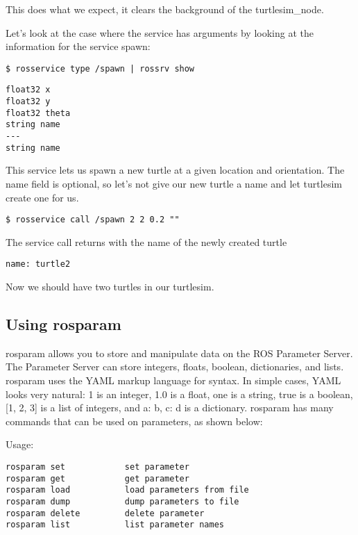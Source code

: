 This does what we expect, it clears the background of the turtlesim\_node.

Let's look at the case where the service has arguments by looking at the information for the service spawn:

\begin{lstlisting}[breaklines=true languages=bash]
$ rosservice type /spawn | rossrv show
\end{lstlisting}

\begin{lstlisting}[breaklines=true languages=bash]
float32 x
float32 y
float32 theta
string name
---
string name
\end{lstlisting}

This service lets us spawn a new turtle at a given location and orientation. The name field is optional, so let's not give our new turtle a name and let turtlesim create one for us.

\begin{lstlisting}[breaklines=true languages=bash]
$ rosservice call /spawn 2 2 0.2 ""
\end{lstlisting}

The service call returns with the name of the newly created turtle
\begin{lstlisting}[breaklines=true languages=bash]
name: turtle2
\end{lstlisting}

Now we should have two turtles in our turtlesim.

\subsection{Using rosparam}
rosparam allows you to store and manipulate data on the ROS Parameter Server. The Parameter Server can store integers, floats, boolean, dictionaries, and lists. rosparam uses the YAML markup language for syntax. In simple cases, YAML looks very natural: 1 is an integer, 1.0 is a float, one is a string, true is a boolean, [1, 2, 3] is a list of integers, and {a: b, c: d} is a dictionary. rosparam has many commands that can be used on parameters, as shown below:

Usage:
\begin{lstlisting}[breaklines=true languages=bash]
rosparam set            set parameter
rosparam get            get parameter
rosparam load           load parameters from file
rosparam dump           dump parameters to file
rosparam delete         delete parameter
rosparam list           list parameter names
\end{lstlisting}

